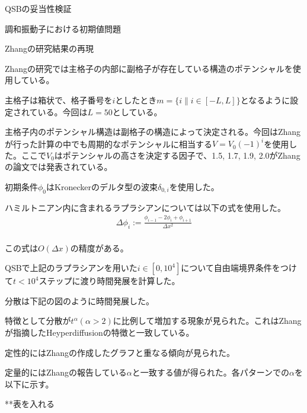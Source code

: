 \documentclass[a4paper, lualatex]{bxjsarticle}
\begin{document}
\begin{section}{QSBの妥当性検証}
\begin{subsection}{調和振動子における初期値問題}
    \end{subsection}
    \begin{subsection}{Zhangの研究結果の再現}
        \par Zhangの研究では主格子の内部に副格子が存在している構造のポテンシャルを使用している。
        \par 主格子は箱状で、格子番号を$i$としたとき$m=\{i \| i \in [-L, L]\}$となるように設定されている。今回は$L=50$としている。
        \par 主格子内のポテンシャル構造は副格子の構造によって決定される。今回はZhangが行った計算の中でも周期的なポテンシャルに相当する$V=V_0 (-1)^i$を使用した。ここで$V_0$はポテンシャルの高さを決定する因子で、1.5, 1.7, 1.9, 2.0がZhangの論文では発表されている。
        \par 初期条件$\phi_0$はKroneckerのデルタ型の波束$\delta_{0,i}$を使用した。
        \par ハミルトニアン内に含まれるラプラシアンについては以下の式を使用した。
        \begin{align}
         \Delta \phi_i := \frac{\phi_{i-1} - 2\phi_{i} + \phi_{i+1}}{\varDelta x^2}\nonumber\\
        \end{align}
        \par この式は$O(\varDelta x)$の精度がある。
        \par QSBで上記のラプラシアンを用いた$i\in [0, 10^4]$について自由端境界条件をつけて$t<10^4$ステップに渡り時間発展を計算した。
        \par 分散は下記の図のように時間発展した。
        \par %
        \par 特徴として分散が$t^\alpha(\alpha>2)$に比例して増加する現象が見られた。これはZhangが指摘したHeyperdiffusionの特徴と一致している。
        \par 定性的にはZhangの作成したグラフと重なる傾向が見られた。
        \par 定量的にはZhangの報告している$\alpha$と一致する値が得られた。各パターンでの$\alpha$を以下に示す。
        \par ***表を入れる
    \end{subsection}
\end{section}
\end{document}
